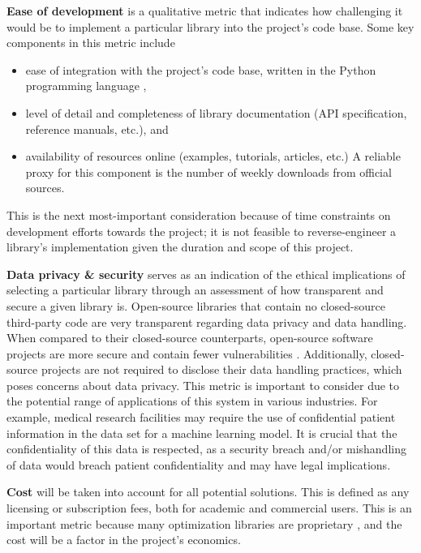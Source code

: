 \documentclass[../mthe-493-final-project.tex]{subfiles}
\begin{document}
    \textbf{Ease of development} is a qualitative metric that indicates how challenging it would be to implement a particular library into the project's code base. Some key components in this metric include
    \begin{itemize}
        \item ease of integration with the project's code base, written in the Python programming language \cite{10.5555/1593511},
        \item level of detail and completeness of library documentation (API specification, reference manuals, etc.), and
        \item availability of resources online (examples, tutorials, articles, etc.) A reliable proxy for this component is the number of weekly downloads from official sources.
    \end{itemize}
    This is the next most-important consideration because of time constraints on development efforts towards the project; it is not feasible to reverse-engineer a library's implementation given the duration and scope of this project.
    
    \textbf{Data privacy \& security} serves as an indication of the ethical implications of selecting a particular library through an assessment of how transparent and secure a given library is. Open-source libraries that contain no closed-source third-party code are very transparent regarding data privacy and data handling. When compared to their closed-source counterparts, open-source software projects are more secure and contain fewer vulnerabilities \cite{clarke2009open}. Additionally, closed-source projects are not required to disclose their data handling practices, which poses concerns about data privacy.
    This metric is important to consider due to the potential range of applications of this system in various industries. For example, medical research facilities may require the use of confidential patient information in the data set for a machine learning model. It is crucial that the confidentiality of this data is respected, as a security breach and/or mishandling of data would breach patient confidentiality and may have legal implications.
    
    \textbf{Cost} will be taken into account for all potential solutions. This is defined as any licensing or subscription fees, both for academic and commercial users. 
    This is an important metric because many optimization libraries are proprietary \cite{wikipedia_list_2011}, and the cost will be a factor in the project's economics.
    
\end{document}
